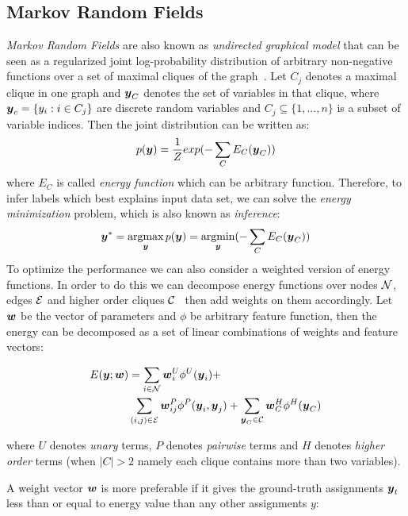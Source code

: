 \documentclass[sigconf, anonymous, review]{acmart}
\renewcommand{\cite}{\citep}
\begin{document}
\subsection{Markov Random Fields}
\label{sec:MRF}
\emph{Markov Random Fields} are also known as \emph{undirected
  graphical model} that can be seen as a regularized joint
log-probability distribution of arbitrary non-negative functions
over a set of maximal cliques of the
graph~\cite{bishop:2006:PRML}. Let $C_j$ denotes a maximal clique
in one graph and ${\boldsymbol{y}}_C$ denotes the set of variables in that
clique, where ${\boldsymbol{y}}_c=\{y_i:i\in C_j\}$ are discrete random
variables and $C_j\subseteq \{1,...,n\}$ is a subset of variable
indices. Then the joint distribution can be written as:
\begin{align}
  \label{eq:energyfunction_init}
  p({\boldsymbol{y}})=\frac{1}{Z}exp(-\sum_{C}{E_C({\boldsymbol{y}}_C)})
\end{align}
\noindent where $E_C$ is called \emph{energy function} which can
be arbitrary function. Therefore, to infer labels which best
explains input data set, we can solve the \emph{energy
  minimization} problem, which is also known as \emph{inference}:
\begin{align}
  \label{eq:inference_init}
  {\boldsymbol{y}}^*=\mathop{\textrm{argmax}}_{{\boldsymbol{y}}}p({\boldsymbol{y}})=\mathop{\textrm{argmin}}_{{\boldsymbol{y}}}(-\sum_{C}{E_C({\boldsymbol{y}}_C)})
\end{align}
To optimize the performance we can also consider a weighted
version of energy functions. In order to do this we can decompose
energy functions over nodes ${\cal N}$, edges ${\cal E}$ and higher order
cliques ${\cal C}$~\cite{Szummer:ECCV08} then add weights on them
accordingly. Let ${\boldsymbol{w}}$ be the vector of parameters and $\phi$ be
arbitrary feature function, then the energy can be decomposed as
a set of linear combinations of weights and feature vectors:

\begin{align}
  \label{eq:energyfunction_UPH}
  E({\boldsymbol{y}};{\boldsymbol{w}})&=\sum_{i\in {\cal N}}{{\boldsymbol{w}}_i^U\phi^U({\boldsymbol{y}}_i)}+ \notag\\
  & \sum_{(i,j)\in {\cal E}}{{\boldsymbol{w}}_{ij}^P\phi^P({\boldsymbol{y}}_i,{\boldsymbol{y}}_j)}+
  \sum_{{\boldsymbol{y}}_C\in {\cal C}}{{\boldsymbol{w}}_C^H\phi^H({\boldsymbol{y}}_C)}
\end{align}

\noindent where $U$ denotes \emph{unary} terms, $P$ denotes
\emph{pairwise} terms and $H$ denotes \emph{higher order} terms
(when $|C|>2$ namely each clique contains more than two
variables).

A weight vector ${\boldsymbol{w}}$ is more preferable if it gives the
ground-truth assignments ${\boldsymbol{y}}_t$ less than or equal to energy
value than any other assignments $y$:
\end{document}
